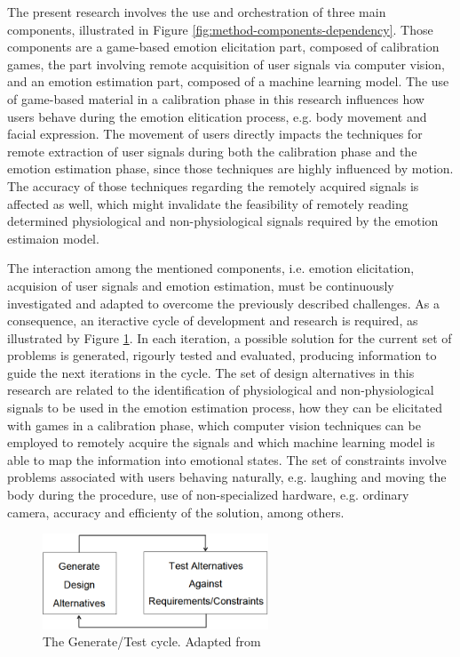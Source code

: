 The present research involves the use and orchestration of three main components, illustrated in Figure \ref{fig:method-components-dependency}. Those components are a game-based emotion elicitation part, composed of calibration games, the part involving remote acquisition of user signals via computer vision, and an emotion estimation part, composed of a machine learning model. The use of game-based material in a calibration phase in this research influences how users behave during the emotion elitication process, e.g. body movement and facial expression. The movement of users directly impacts the techniques for remote extraction of user signals during both the calibration phase and the emotion estimation phase, since those techniques are highly influenced by motion. The accuracy of those techniques regarding the remotely acquired signals is affected as well, which might invalidate the feasibility of remotely reading determined physiological and non-physiological signals required by the emotion estimaion model.

The interaction among the mentioned components, i.e. emotion elicitation, acquision of user signals and emotion estimation, must be continuously investigated and adapted to overcome the previously described challenges. As a consequence, an iteractive cycle of development and research is required, as illustrated by Figure \ref{fig:hevner-generate-test}. In each iteration, a possible solution for the current set of problems is generated, rigourly tested and evaluated, producing information to guide the next iterations in the cycle. The set of design alternatives in this research are related to the identification of physiological and non-physiological signals to be used in the emotion estimation process, how they can be elicitated with games in a calibration phase, which computer vision techniques can be employed to remotely acquire the signals and which machine learning model is able to map the information into emotional states. The set of constraints involve problems associated with users behaving naturally, e.g. laughing and moving the body during the procedure, use of non-specialized hardware, e.g. ordinary camera, accuracy and efficienty of the solution, among others.

\begin{figure}[h]
    \centering
    \includegraphics[width=0.6\textwidth]{figures/hevner-generate-test.png}
    \caption{The Generate/Test cycle. Adapted from \textcite{hevner2004design}}
    \label{fig:hevner-generate-test}
\end{figure}


